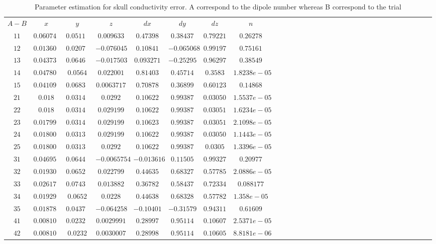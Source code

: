  \begin{table}[!htbp]
\centering
\caption{Parameter estimation for skull conductivity error. A correspond to the dipole number whereas B correspond to the trial }\label{end1}

\begin{tabular}{c c c c c c c c c c c c c c c c c c c c c c c c c c c c c c c } 
   \hline 

$A-B $&$ x$&$y$&$z$&$dx$&$dy$&$dz$&$n$\\
$11 $&$0.060748$&$0.051155$&$0.009633$&$0.47398$&$     0.38437$&$ 0.79221$&$0.26278$\\
$12 $&$0.013604$&$ 0.020788$&$-0.076045$&$  0.10841$&$-0.065068$&$  0.99197 $&$0.75161$\\
$13 $&$0.043731$&$ 0.064662$&$-0.017503$&$ 0.093271$&$ -0.25295$&$0.96297$&$0.38549$\\
$14 $&$0.047802$&$   0.0564$&$ 0.022001$&$     0.81403$&$0.45714 $&$0.3583$&$1.8238e-05$\\
$15 $&$0.041097$&$  0.06834$&$0.0063717$&$  0.70878$&$0.36899$&$ 0.60123$&$0.14868$\\
$21 $&$0.018    $&$0.031401$&$   0.0292$&$ 0.10622$&$  0.99387$&$ 0.030506$&$ 1.5537e-05$\\
$22 $&$0.018    $&$0.031401$&$ 0.029199 $&$0.10622$&$  0.99387$&$ 0.030513$&$1.6234e-05$\\
$23 $&$0.017999$&$0.031402$&$0.029199$&$0.10623     $&$0.99387$&$0.03051$&$2.1098e-05$\\
$24 $&$0.018001$&$ 0.031399$&$  0.029199$&$   0.10622  $&$  0.99387$&$0.030506$&$1.1443e-05$\\
$25 $&$0.018001$&$ 0.031399$&$   0.0292$&$ 0.10622$&$0.99387$&$0.0305$&$1.3396e-05$\\
$31 $&$0.046955$&$ 0.064436$&$-0.0065754$&$ -0.013616$&$0.11505 $&$0.99327$&$0.20977$\\
$32 $&$0.019301$&$ 0.065201$&$ 0.022799$&$  0.44635$&$0.68327$&$ 0.57785$&$  2.0886e-05$\\
$33 $&$0.026176$&$ 0.074311$&$ 0.013882$&$  0.36782$&$  0.58437$&$ 0.72334 $&$0.088177$\\
$34 $&$0.019299$&$   0.0652$&$   0.0228$&$  0.44638$&$  0.68328 $&$0.57782$&$1.358e-05$\\
$35 $&$0.018783$&$ 0.043797$&$-0.064258$&$-0.10401$&$-0.31579$&$ 0.94311$&$0.61609$\\
$41 $&$0.0081018$&$ 0.023201$&$ 0.0029991$&$  0.28997$&$0.95114$&$0.10607$&$2.5371e-05$\\
$42 $&$0.0081004$&$   0.0232$&$ 0.0030007$&$  0.28998$&$  0.95114 $&$0.10605$&$8.8181e-06$\\

\end{tabular}
\end{table}
